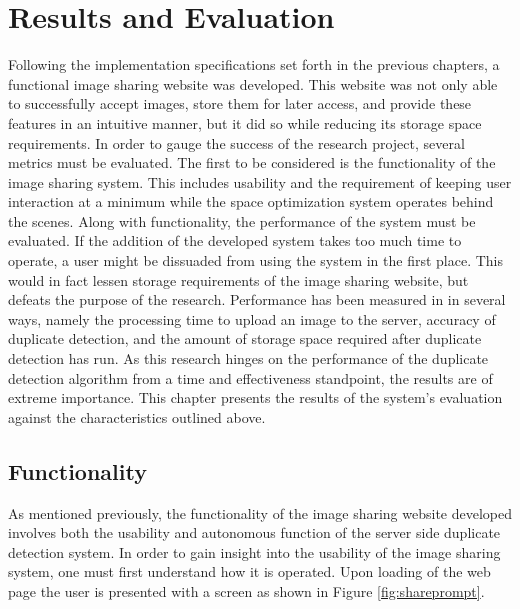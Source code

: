 %
%
%
\chapter{Results and Evaluation}\label{ch:reseval}
Following the implementation specifications set forth in the previous chapters, a functional image sharing website was developed. This website was not only able to successfully accept images, store them for later access, and provide these features in an intuitive manner, but it did so while reducing its storage space requirements. In order to gauge the success of the research project, several metrics must be evaluated. The first to be considered is the functionality of the image sharing system. This includes usability and the requirement of keeping user interaction at a minimum while the space optimization system operates behind the scenes. Along with functionality, the performance of the system must be evaluated. If the addition of the developed system takes too much time to operate, a user might be dissuaded from using the system in the first place. This would in fact lessen storage requirements of the image sharing website, but defeats the purpose of the research. Performance has been measured in in several ways, namely the processing time to upload an image to the server, accuracy of duplicate detection, and the amount of storage space required after duplicate detection has run. As this research hinges on the performance of the duplicate detection algorithm from a time and effectiveness standpoint, the results are of extreme importance. This chapter presents the results of the system's evaluation against the characteristics outlined above.

\section{Functionality}
As mentioned previously, the functionality of the image sharing website developed involves both the usability and autonomous function of the server side duplicate detection system. In order to gain insight into the usability of the image sharing system, one must first understand how it is operated. Upon loading of the web page the user is presented with a screen as shown in Figure \ref{fig:shareprompt}.

